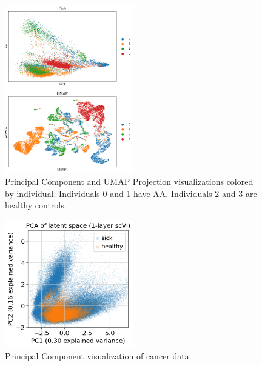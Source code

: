 \documentclass{article}
\begin{document}
\begin{figure}
  \centering
  \includegraphics[width=0.5\textwidth]{individual.png}
  \caption{Principal Component and UMAP Projection visualizations colored by individual. Individuals 0 and 1 have AA. Individuals 2 and 3 are healthy controls.}
  \label{PCA_projections_individual}
\end{figure}

\begin{figure}
  \centering
  \includegraphics[width=0.5\textwidth]{cancer_pca.jpg}
  \caption{Principal Component visualization of cancer data.}
  \label{cancer_PCA_projections}
\end{figure}
\end{document}
